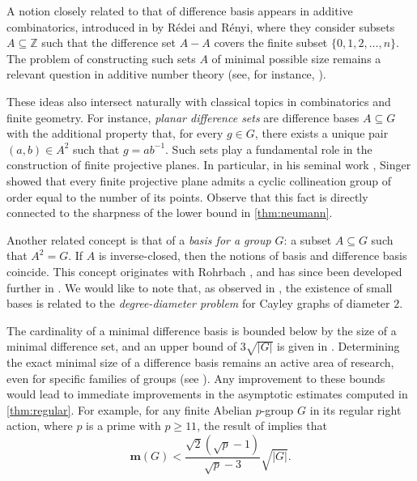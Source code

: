 \documentclass[a4paper]{amsart}
\newcommand{\m}{\mathbf{m}}
\theoremstyle{definition}
\begin{document}
A notion closely related to that of difference basis appears in additive combinatorics, introduced in \cite{RedeiRenyi1949} by R\'edei and R\'enyi, where they consider subsets $A \subseteq \mathbb{Z}$ such that the difference set $A - A$ covers the finite subset $\{0,1,2,\dots, n\}$. The problem of constructing such sets $A$ of minimal possible size remains a relevant question in additive number theory (see, for instance, \cite{BernshteynTait2019,Schoen2007}).

These ideas also intersect naturally with classical topics in combinatorics and finite geometry. For instance, \emph{planar difference sets} are difference bases $A \subseteq G$ with the additional property that, for every $g \in G$, there exists a unique pair $(a,b) \in A^2$ such that $g = ab^{-1}$. Such sets play a fundamental role in the construction of finite projective planes. In particular, in his seminal work \cite{Singer1938}, Singer showed that every finite projective plane admits a cyclic collineation group of order equal to the number of its points. Observe that this fact is directly connected to the sharpness of the lower bound in \cref{thm:neumann}.

Another related concept is that of a \emph{basis for a group $G$}: a subset $A \subseteq G$ such that $A^2 = G$. If $A$ is inverse-closed, then the notions of basis and difference basis coincide. This concept originates with Rohrbach \cite{Rohrbach1937}, and has since been developed further in \cite{BertramHerzog1991,KozmaLev1992,Nathanson1992}. We would like to note that, as observed in \cite{MacbethSiagiovaSiran2012}, the existence of small bases is related to the \emph{degree-diameter problem} for Cayley graphs of diameter $2$.

The cardinality of a minimal difference basis is bounded below by the size of a minimal difference set, and an upper bound of $3\sqrt{|G|}$ is given in \cite{FinkelsteinKleitmanLeighton1988}. Determining the exact minimal size of a difference basis remains an active area of research, even for specific families of groups (see \cite{BanakhGavrylkiv2019Cyclic,BanakhGavrylkiv2019Dihedral,BanakhGavrylkiv2019Abelian}). Any improvement to these bounds would lead to immediate improvements in the asymptotic estimates computed in \cref{thm:regular}. For example, for any finite Abelian $p$-group $G$ in its regular right action, where $p$ is a prime with $p \geq 11$, the result of \cite{BanakhGavrylkiv2019Abelian} implies that
\[
\m(G) < \frac{\sqrt{2}(\sqrt{p} - 1)}{\sqrt{p} - 3} \sqrt{|G|}.
\]
\end{document}
